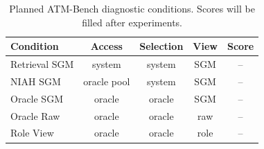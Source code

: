 \begin{table}[t]
\centering
\small
\begin{tabular}{lcccc}
\toprule
Condition & Access & Selection & View & Score \\
\midrule
Retrieval SGM & system & system & SGM & -- \\
NIAH SGM & oracle pool & system & SGM & -- \\
Oracle SGM & oracle & oracle & SGM & -- \\
Oracle Raw & oracle & oracle & raw & -- \\
Role View & oracle & oracle & role & -- \\
\bottomrule
\end{tabular}
\caption{Planned ATM-Bench diagnostic conditions. Scores will be filled after experiments.}
\label{tab:atm-diagnostic}
\end{table}
